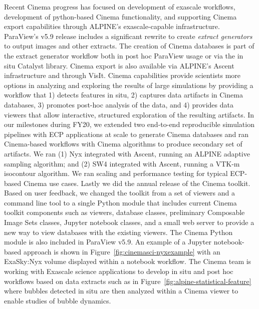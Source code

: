 Recent Cinema progress has focused on development of exascale workflows, development of python-based Cinema functionality, and supporting Cinema export capabilities through ALPINE's exascale-capable infrastructure.  ParaView's v5.9 release includes a significant rewrite to create \textit{extract generators} to output images and other extracts.  The creation of Cinema databases is part of the extract generator workflow both in post hoc ParaView usage or via the in situ Catalyst library.  Cinema export is also available via ALPINE's Ascent infrastructure and through VisIt.    
Cinema capabilities provide scientists more options in analyzing and exploring the results of large simulations by providing a workflow that 1) detects features in situ, 2) captures data artifacts in Cinema databases, 3) promotes post-hoc analysis of the data, and 4) provides data viewers that allow interactive, structured exploration of the resulting artifacts. 
%
In our milestones during FY20, we extended two end-to-end reproducible simulation pipelines with ECP applications at scale to generate Cinema databases and ran Cinema-based workflows with Cinema algorithms to produce secondary set of artifacts.  We ran (1) Nyx integrated with Ascent, running an ALPINE adaptive sampling algorithm; and (2) SW4 integrated with Ascent, running a VTK-m isocontour algorithm.   We ran scaling and performance testing for typical ECP-based Cinema use cases.  Lastly we did the annual release of the Cinema toolkit.  Based on user feedback, we  changed the toolkit from a set of viewers and a command line tool to a single Python module that includes current Cinema toolkit components such as viewers, database classes, preliminary Composable Image Sets classes, Jupyter notebook classes, and a small web server to provide a new way to view databases with the existing viewers.  The Cinema Python module is also included in ParaView v5.9. An example of a Jupyter notebook-based approach is shown in Figure~\ref{fig:cinemasci-nyxexample} with an ExaSky:Nyx volume displayed within a notebook workflow.   The Cinema team is working with Exascale science applications to develop in situ and post hoc workflows based on data extracts such as in Figure~\ref{fig:alpine-statistical-feature} where bubbles detected in situ are then analyzed within a Cinema viewer to enable studies of bubble dynamics.  



